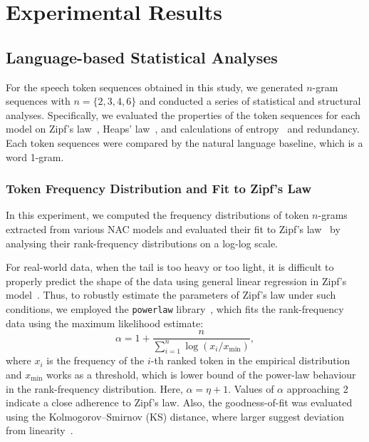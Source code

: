 \documentclass[conference]{IEEEtran}
\begin{document}
\section{Experimental Results}
\vspace{-1mm}
\subsection{Language-based Statistical Analyses}

For the speech token sequences obtained in this study, we generated $n$-gram sequences with $n = \{2, 3, 4, 6\}$ and conducted a series of statistical and structural analyses. Specifically, we evaluated the properties of the token sequences for each model on Zipf's law~\cite{zipf1949human}, Heaps' law~\cite{heaps1978information}, and calculations of entropy~\cite{shannon1951prediction} and redundancy. Each token sequences were compared by the natural language baseline, which is a word 1-gram.

\subsubsection{Token Frequency Distribution and Fit to Zipf's Law}

In this experiment, we computed the frequency distributions of token $n$-grams extracted from various NAC models and evaluated their fit to Zipf's law~\cite{zipf1949human} by analysing their rank-frequency distributions on a log-log scale.

For real-world data, when the tail is too heavy or too light, it is difficult to properly predict the shape of the data using general linear regression in Zipf's model~\cite{chan2024analyzinglanguagevisualtokens}. Thus, to robustly estimate the parameters of Zipf's law under such conditions, we employed the \texttt{powerlaw} library~\cite{clauset2009powerlaw}, which fits the rank-frequency data using the maximum likelihood estimate:
\[
\alpha = 1 + \frac{n}{\sum_{i=1}^{n} \log(x_i / x_{\min})},
\]
where \( x_i \) is the frequency of the \( i \)-th ranked token in the empirical distribution and \( x_{\min} \) works as a threshold, which is lower bound of the power-law behaviour in the rank-frequency distribution.
Here, \( \alpha = \eta + 1 \). Values of \( \alpha \) approaching 2 indicate a close adherence to Zipf’s law. Also, the goodness-of-fit was evaluated using the Kolmogorov–Smirnov (KS) distance, where larger suggest deviation from linearity~\cite{KSdistance}.
\end{document}
